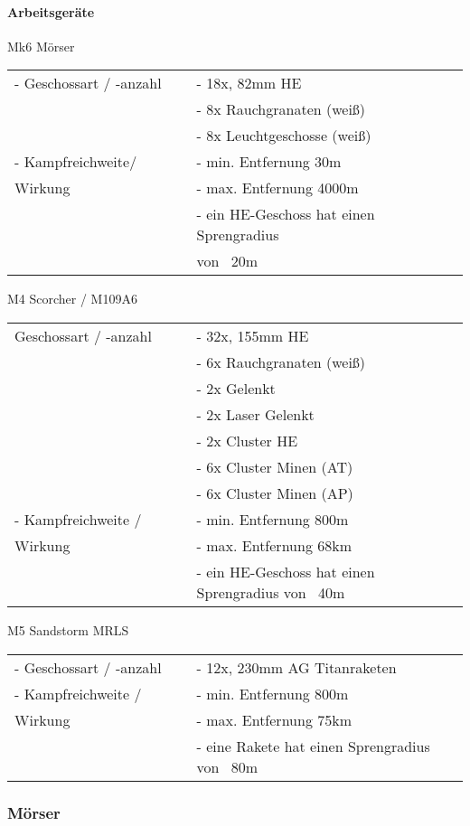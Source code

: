 \paragraph{Arbeitsgeräte}
	Mk6 Mörser
	\begin{longtable}{p{0.4\linewidth} p{0.6\linewidth} }
		- Geschossart / -anzahl  	& - 18x, 82mm HE \\
		 				& - 8x Rauchgranaten (weiß) \\
		 				& - 8x Leuchtgeschosse (weiß) \\
		- Kampfreichweite/  	& - min. Entfernung 30m \\
		Wirkung  			& - max. Entfernung 4000m \\
		 				& - ein HE-Geschoss hat einen Sprengradius \\
		 				& von ~20m \\
	\end{longtable}

	M4 Scorcher / M109A6
	\begin{longtable}{p{0.4\linewidth} p{0.6\linewidth} }
		Geschossart / -anzahl  	& - 32x, 155mm HE \\
						& - 6x Rauchgranaten (weiß) \\
						& - 2x Gelenkt \\
 						& - 2x Laser Gelenkt \\
 						& - 2x Cluster HE \\
 						& - 6x Cluster Minen (AT) \\
 						& - 6x Cluster Minen (AP) \\
		- Kampfreichweite /  	& - min. Entfernung 800m \\
		Wirkung  			& - max. Entfernung 68km \\
 						& - ein HE-Geschoss hat einen Sprengradius von ~40m \\
	\end{longtable}

	M5 Sandstorm MRLS
	\begin{longtable}{p{0.4\linewidth} p{0.6\linewidth} }
		- Geschossart / -anzahl  	& - 12x, 230mm AG Titanraketen \\
		- Kampfreichweite / 	& - min. Entfernung 800m \\
		Wirkung  			& - max. Entfernung 75km \\
						& - eine Rakete hat einen Sprengradius von ~80m \\
	\end{longtable}

\subsubsection{Mörser}

